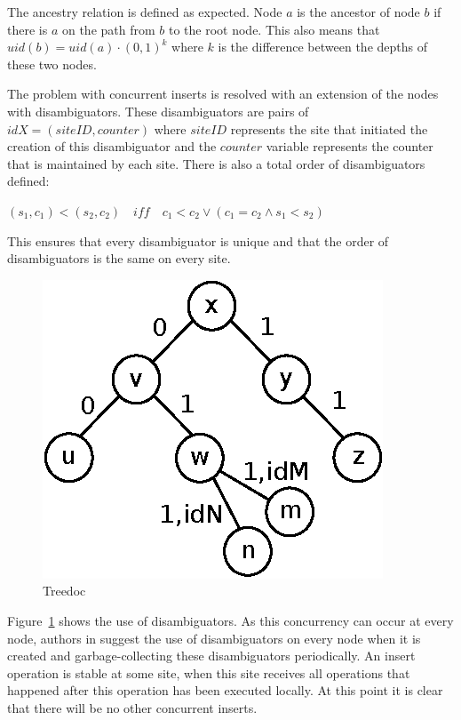 \documentclass[12pt,oneside]{fithesis2}
\begin{document}
\par The ancestry relation is defined as expected. Node \(a\) is the ancestor of node \(b\) if there is \(a\) on the path from \(b\) to the root node. This also means that \( uid(b) = uid(a) \cdot (0,1)^k \) where \(k\) is the difference between the depths of these two nodes.
\par The problem with concurrent inserts is resolved with an extension of the nodes with disambiguators. These disambiguators are pairs of \(idX = (siteID, counter)\) where \(siteID\) represents the site that initiated the creation of this disambiguator and the \(counter\) variable represents the counter that is maintained by each site. There is also a total order of disambiguators defined: \begin{center} \( (s_1,c_1) < (s_2,c_2) \quad iff \quad c_1<c_2 \vee (c_1=c_2 \wedge s_1 < s_2) \) \end{center} This ensures that every disambiguator is unique and that the order of disambiguators is the same on every site. 
\begin{figure}[H]
\caption{Treedoc}
\label{fig:treedoc2}
\centering
\vspace{5mm}
\includegraphics{treedoc2} 
\end{figure}
\par Figure~\ref{fig:treedoc2} shows the use of disambiguators. As this concurrency can occur at every node, authors in \cite{Shapiro-design} suggest the use of disambiguators on every node when it is created and garbage-collecting these disambiguators periodically. An insert operation is stable at some site, when this site receives all operations that happened after this operation has been executed locally. At this point it is clear that there will be no other concurrent inserts. 
\end{document}
